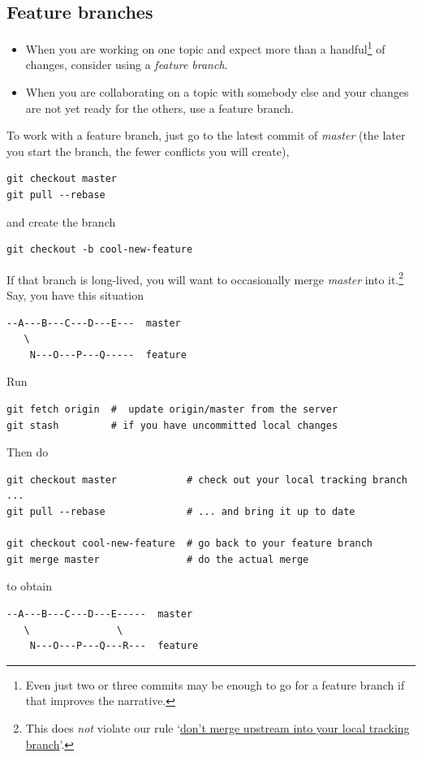 \documentclass[12pt,pdftex]{article}
\begin{document}
\subsection{Feature branches}
\label{sec-5-2}

\begin{itemize}
\item When you are working on one topic and expect more than a
handful\footnote{Even just two or three commits may be enough to go for a feature
branch if that improves the narrative.} of changes, consider using a \emph{feature branch}.

\item When you are collaborating on a topic with somebody else and your
changes are not yet ready for the others, use a feature branch.
\end{itemize}


To work with a feature branch, just go to the latest commit of \emph{master}
(the later you start the branch, the fewer conflicts you will create),

\lstset{frame=single,basicstyle=\ttfamily\footnotesize,language=sh,label= ,caption= ,captionpos=b,numbers=none}
\begin{lstlisting}
git checkout master
git pull --rebase
\end{lstlisting}
and create the branch
\lstset{frame=single,basicstyle=\ttfamily\footnotesize,language=sh,label= ,caption= ,captionpos=b,numbers=none}
\begin{lstlisting}
git checkout -b cool-new-feature
\end{lstlisting}

\bigskip

If that branch is long-lived, you will want to occasionally merge
\emph{master} into it.\footnote{This does \emph{not} violate our rule
`\hyperref[sec-5-1]{don't merge upstream into your local tracking branch}'.}
Say, you have this situation
\begin{verbatim}
--A---B---C---D---E---  master
   \
    N---O---P---Q-----  feature
\end{verbatim}
Run
\lstset{frame=single,basicstyle=\ttfamily\footnotesize,language=sh,label= ,caption= ,captionpos=b,numbers=none}
\begin{lstlisting}
git fetch origin  #  update origin/master from the server
git stash         # if you have uncommitted local changes
\end{lstlisting}

Then do
\lstset{frame=single,basicstyle=\ttfamily\footnotesize,language=sh,label= ,caption= ,captionpos=b,numbers=none}
\begin{lstlisting}
git checkout master            # check out your local tracking branch ...
git pull --rebase              # ... and bring it up to date

git checkout cool-new-feature  # go back to your feature branch
git merge master               # do the actual merge
\end{lstlisting}
to obtain
\begin{verbatim}
--A---B---C---D---E-----  master
   \               \
    N---O---P---Q---R---  feature
\end{verbatim}
\end{document}
